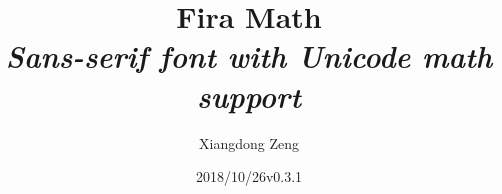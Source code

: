 \documentclass{article}
\title{\bfseries\huge Fira Math\\
  \itshape\Large Sans-serif font with Unicode math support}
\author{Xiangdong Zeng}
\date{2018/10/26\quad v0.3.1}
\begin{document}
\maketitle
\printtable
\end{document}
